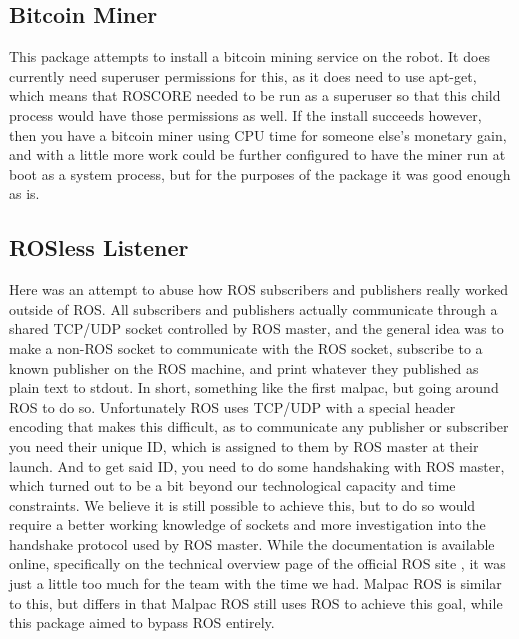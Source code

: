 \documentclass[IEEEtran,letterpaper,10pt,notitlepage,draftclsnofoot,onecolumn]{article}
\begin{document}
\subsection{Bitcoin Miner}
This package attempts to install a bitcoin mining service on the robot.
It does currently need superuser permissions for this, as it does need to use apt-get, which means that ROSCORE 
needed to be run as a superuser so that this child process would have those permissions as well.
If the install succeeds however, then you have a bitcoin miner using CPU time for someone else’s monetary gain, and with a 
little more work could be further configured to have the miner run at boot as a system process, but for the purposes of the 
package it was good enough as is.

\subsection{ROSless Listener}
Here was an attempt to abuse how ROS subscribers and publishers really worked outside of ROS.
All subscribers and publishers actually communicate through a shared TCP/UDP socket controlled by ROS master, and the general 
idea was to make a non-ROS socket to communicate with the ROS socket, subscribe to a known publisher on the ROS machine, and 
print whatever they published as plain text to stdout.
In short, something like the first malpac, but going around ROS to do so. Unfortunately ROS uses TCP/UDP with a special header encoding that makes this difficult, as to communicate any publisher or subscriber you need their unique ID, which is assigned to them by ROS master at their launch. And to get said ID, you need to do some handshaking with ROS master, which turned out to be a bit beyond our technological capacity and time constraints.
We believe it is still possible to achieve this, but to do so would require a better working knowledge of sockets and more 
investigation into the handshake protocol used by ROS master.
While the documentation is available online, specifically on the technical overview page of the official ROS site \cite{ROS}, it was just a little too much for the team with the time we had. Malpac ROS is similar to this, but differs in that Malpac ROS 
still uses ROS to achieve this goal, while this package aimed to bypass ROS entirely.
\end{document}
